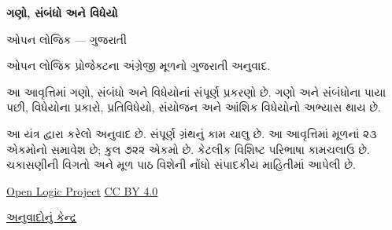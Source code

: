 
\usepackage[authoryear]{natbib}
\renewcommand{\refname}{સંદર્ભગ્રંથો}
\renewcommand{\partname}{ભાગ}
\newenvironment{intro}{}{}
\newcommand{\Id}[1]{\mathord{\mathrm{Id}_{#1}}}
\newcommand{\equivrep}[2]{[#1]_{#2}}
\newcommand{\equivclass}[2]{#1/_{\!{#2}}}
\newcommand{\funrestrictionto}[2]{#1\mathord{\restriction}_{#2}}
\newcommand{\funimage}[2]{#1[#2]}
\newcommand{\emptyseq}{\Lambda}
\newcommand{\liff}{\mathbin{\leftrightarrow}}
\newcommand{\dom}[1]{\mathrm{dom}(#1)}
\newcommand{\ran}[1]{\mathrm{ran}(#1)}
\newcommand{\comp}[2]{#2\circ #1}
\newcommand{\pto}{\mathrel{\ooalign{\hfil$\mapstochar\mkern5mu$\hfil\cr$\to$}}}
\newcommand{\fdefined}{\downarrow}
\newcommand{\fundefined}{\uparrow}
\newcommand{\sourcecorrection}[2]{%
  \par\smallskip\noindent
  \fbox{\begin{minipage}{0.94\linewidth}\small
    \textbf{સ્રોત-સુધારો #1.} #2
  \end{minipage}}%
  \par\smallskip}
\newlength{\olphotowidth}
\setlength{\olphotowidth}{.4\textwidth}

\renewcommand{\oliflabeldef}[3]{\ifcsname guavailable@#1\endcsname#2\else#3\fi}

\begin{titlepage}
{\Huge\bfseries ગણો, સંબંધો અને વિધેયો\par}
\vspace{1em}
{\Large ઓપન લોજિક — ગુજરાતી\par}
\vspace{2em}
ઓપન લોજિક પ્રોજેક્ટના અંગ્રેજી મૂળનો ગુજરાતી અનુવાદ.\par
\vspace{1em}
આ આવૃત્તિમાં ગણો, સંબંધો અને વિધેયોનાં સંપૂર્ણ પ્રકરણો છે.
ગણો અને સંબંધોના પાયા પછી, વિધેયોના પ્રકારો, પ્રતિવિધેયો,
સંયોજન અને આંશિક વિધેયોનો અભ્યાસ થાય છે.\par
\vfill
આ યંત્ર દ્વારા કરેલો અનુવાદ છે. સંપૂર્ણ ગ્રંથનું કામ ચાલુ છે.
આ આવૃત્તિમાં મૂળનાં ૨૩ એકમોનો સમાવેશ છે; કુલ ૭૨૨ એકમો છે.
કેટલીક વિશિષ્ટ પરિભાષા કામચલાઉ છે. ચકાસણીની વિગતો અને
મૂળ પાઠ વિશેની નોંધો સંપાદકીય માહિતીમાં આપેલી છે.\par
\vspace{1em}
\href{https://github.com/OpenLogicProject/OpenLogic}{Open Logic Project}
\quad \href{https://creativecommons.org/licenses/by/4.0/}{CC BY 4.0}\par
\href{https://github.com/KokunoYumeto/OpenLogic-translations}{અનુવાદોનું કેન્દ્ર}\par
\end{titlepage}
\tableofcontents
\clearpage

\clearpage
